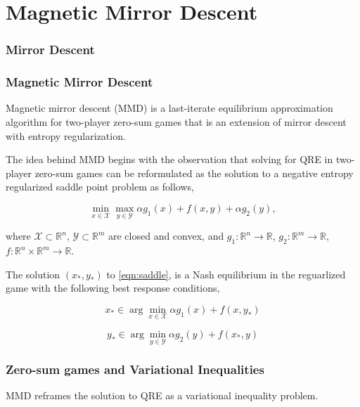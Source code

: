 \chapter{Magnetic Mirror Descent}

\subsection{Mirror Descent}




\subsection[MMD]{Magnetic Mirror Descent}

Magnetic mirror descent (MMD) \cite{sokotaUnified2023} is a last-iterate equilibrium approximation algorithm
for two-player zero-sum games that is an extension of mirror descent with entropy regularization.

The idea behind MMD begins with the observation that solving for QRE in two-player zero-sum games can
be reformulated as the solution to a negative entropy regularized saddle point problem as follows,

\begin{equation}\label{eqn:saddle}
    \min_{x \in \mathcal{X}} \max_{y \in \mathcal{Y}} \alpha g_1(x) + f(x, y) + \alpha g_2(y),
\end{equation}

where $\mathcal{X} \subset \mathbb{R}^n$, $\mathcal{Y} \subset \mathbb{R}^m$ are closed and convex, and
$g_1: \mathbb{R}^n \rightarrow \mathbb{R}$,
$g_2: \mathbb{R}^m \rightarrow \mathbb{R}$,
$f : \mathbb{R}^n \times \mathbb{R}^m \rightarrow \mathbb{R}$.

The solution $(x_{\ast}, y_{\ast})$ to \ref{eqn:saddle}, is a Nash equilibrium in the reguarlized game
with the following best response conditions,

\begin{equation}\label{eqn:bestrescon1}
    x_{\ast} \in \arg \min_{x \in \mathcal{X}} \alpha g_1(x) + f(x, y_{\ast})
\end{equation}

\begin{equation}\label{eqn:bestrescon2}
    y_{\ast} \in \arg \min_{y \in \mathcal{Y}} \alpha g_2(y) + f(x_{\ast}, y)
\end{equation}


\subsection*{Zero-sum games and Variational Inequalities}
MMD reframes the solution to QRE as a variational inequality problem.

